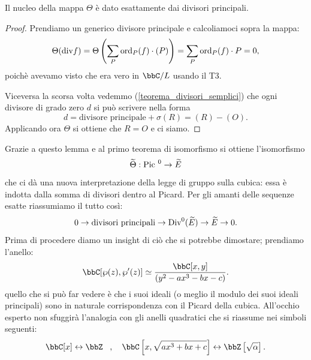 
\begin{lemma}
Il nucleo della mappa $\Theta$ è dato esattamente dai divisori principali.
\end{lemma}
\begin{proof}
Prendiamo un generico divisore principale e calcoliamoci sopra la mappa:
\[
\Theta(\mbox{div} f)=\Theta\left(\sum_P \text{ord}_P(f) \cdot (P)\right)=\sum_P \text{ord}_P(f)\cdot P=0,
\]
poichè avevamo visto che era vero in $\bbC/L$ usando il T3.

Viceversa la scorsa volta vedemmo (\ref{teorema_divisori_semplici}) che ogni divisore di grado zero $d$ si può scrivere nella forma
	\[
		d = \mbox{divisore principale} + \sigma(R) = (R) - (O).
	\]
Applicando ora $\Theta$ si ottiene che $R=O$ e ci siamo.
\end{proof}


Grazie a questo lemma e al primo teorema di isomorfismo si ottiene l'isomorfismo
\[
\widetilde{\Theta}: \mbox{Pic }^0 \rightarrow \widetilde{E}
\]
che ci dà una nuova interpretazione della legge di gruppo sulla cubica: essa è indotta dalla somma di divisori dentro al Picard. Per gli amanti delle sequenze esatte riassumiamo il tutto così:
\[
0\rightarrow\mbox{divisori principali}\rightarrow \mbox{Div}^0(\widetilde{E})\rightarrow \widetilde{E}\rightarrow 0.
\]
Prima di procedere diamo un insight di ciò che si potrebbe dimostare; prendiamo l'anello:
\[
\bbC[\wp(z),\wp'(z)]\simeq\frac{\bbC[x,y]}{(y^2 - ax^3 - bx - c)}.
\]
quello che si può far vedere è che i suoi ideali (o meglio il modulo dei suoi ideali principali) sono in naturale corrispondenza con il Picard della cubica. All'occhio esperto non sfuggirà l'analogia con gli anelli quadratici che si riassume nei simboli seguenti:
\[
\bbC[x] \leftrightarrow \bbZ\, \ \ , \ \ \ \bbC\left[x,\sqrt{ax^3+bx+c}\right] \leftrightarrow \bbZ\left[\sqrt{\alpha}\right].
\]
